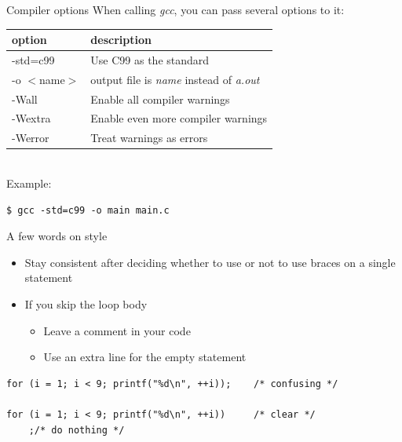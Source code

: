 \begin{frame}[fragile]{Compiler options}
	When calling \textit{gcc}, you can pass several options to it:\\
	\bigskip
	\begin{tabular}{|l|l|}
		\hline
		\textbf{option} & \textbf{description} \\\hline
		-std=c99 & Use C99 as the standard \\\hline
		-o $<$name$>$ & output file is \textit{name} instead of \textit{a.out} \\\hline
		-Wall & Enable all compiler warnings \\\hline
		-Wextra & Enable even more compiler warnings \\\hline
		-Werror & Treat warnings as errors \\\hline
	\end{tabular}\\
	\bigskip
	Example:
	\begin{lstlisting}[numbers=none]
$ gcc -std=c99 -o main main.c
\end{lstlisting}
\end{frame}

\begin{frame}[fragile]{A few words on style}
	\begin{itemize}
        \item Stay consistent after deciding whether to use or not to use braces on a single statement
		\item If you skip the loop body
		\begin{itemize}
			\item Leave a comment in your code
			\item Use an extra line for the empty statement
		\end{itemize}
	\end{itemize}
		\begin{lstlisting}[numbers=none]
for (i = 1; i < 9; printf("%d\n", ++i));    /* confusing */

for (i = 1; i < 9; printf("%d\n", ++i))     /* clear */
    ;/* do nothing */
\end{lstlisting}
\end{frame}

